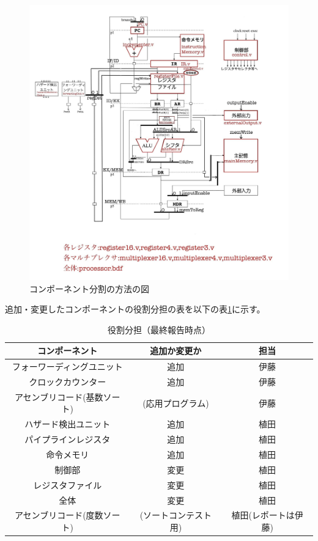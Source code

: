 \documentclass[a4j,titlepage]{jarticle}
\begin{document}
\begin{figure}[H]
    \begin{center}
    \includegraphics[scale = 0.22]{structure0530.jpg}
    \end{center}
    \caption{コンポーネント分割の方法の図}
    \label{moduleSplit0422}
\end{figure}

追加・変更したコンポーネントの役割分担の表を以下の表\ref{rolesDivision0422}に示す。

\begin{table}[H]
    \caption{役割分担（最終報告時点）}
    \label{rolesDivision0422}
    \begin{center}
    \begin {tabular}{|c|c|c|} \hline
         コンポーネント & 追加か変更か & 担当 \\ \hline \hline
         フォーワーディングユニット & 追加 & 伊藤\\ \hline
         クロックカウンター & 追加 & 伊藤 \\ \hline
         アセンブリコード(基数ソート) & (応用プログラム) & 伊藤\\ \hline
         ハザード検出ユニット & 追加 & 植田\\ \hline
         パイプラインレジスタ & 追加 & 植田\\ \hline
         命令メモリ & 追加 & 植田 \\ \hline
         制御部 & 変更 & 植田\\ \hline
         レジスタファイル & 変更 & 植田 \\ \hline
         全体 & 変更 & 植田 \\ \hline
         アセンブリコード(度数ソート) & (ソートコンテスト用) & 植田(レポートは伊藤) \\ \hline
    \end {tabular}
    \end{center}
\end{table}
\end{document}
